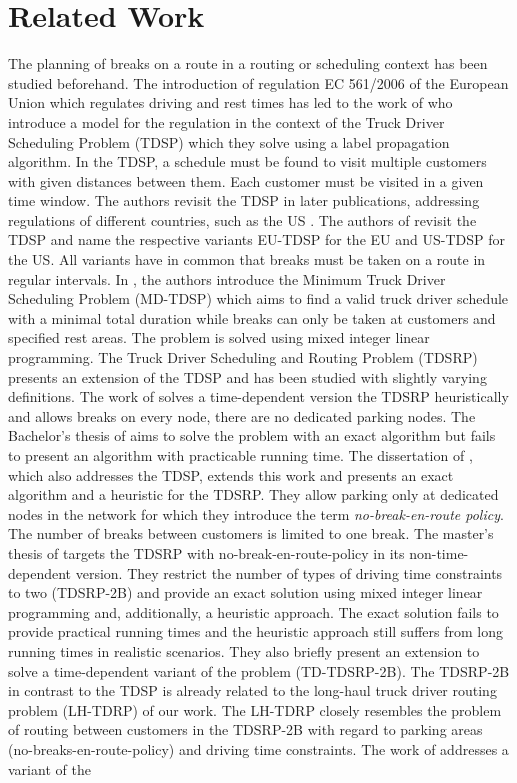 
\chapter{Related Work\label{ch:related_work}}
The planning of breaks on a route in a routing or scheduling context has been studied beforehand. The introduction of regulation EC 561/2006 of the European Union \cite{europeanparliament:2006} which regulates driving and rest times has led to the work of \cite{goel:2009} who introduce a model for the regulation in the context of the Truck Driver Scheduling Problem (TDSP) which they solve using a label propagation algorithm. In the TDSP, a schedule must be found to visit multiple customers with given distances between them. Each customer must be visited in a given time window. The authors revisit the TDSP in later publications, addressing regulations of different countries, such as the US \cite{goel:2012}. The authors of \cite{sartori:20210107} revisit the TDSP and name the respective variants EU-TDSP for the EU and US-TDSP for the US. All variants have in common that breaks must be taken on a route in regular intervals. In \cite{goel:2012a}, the authors introduce the Minimum Truck Driver Scheduling Problem (MD-TDSP) which aims to find a valid truck driver schedule with a minimal total duration while breaks can only be taken at customers and specified rest areas. The problem is solved using mixed integer linear programming. The Truck Driver Scheduling and Routing Problem (TDSRP) presents an extension of the TDSP and has been studied with slightly varying definitions. The work of \cite{shah:2008} solves a time-dependent version the TDSRP heuristically and allows breaks on every node, there are no dedicated parking nodes. The Bachelor's thesis of \cite{braeuer:2016} aims to solve the problem with an exact algorithm but fails to present an algorithm with practicable running time. The dissertation of \cite{kleff:2019}, which also addresses the TDSP, extends this work and presents an exact algorithm and a heuristic for the TDSRP. They allow parking only at dedicated nodes in the network for which they introduce the term \emph{no-break-en-route policy}. The number of breaks between customers is limited to one break. The master's thesis of \cite{bomsdorf:2020} targets the TDSRP with no-break-en-route-policy in its non-time-dependent version. They restrict the number of types of driving time constraints to two (TDSRP-2B) and provide an exact solution using mixed integer linear programming and, additionally, a heuristic approach. The exact solution fails to provide practical running times and the heuristic approach still suffers from long running times in realistic scenarios. They also briefly present an extension to solve a time-dependent variant of the problem (TD-TDSRP-2B). The TDSRP-2B in contrast to the TDSP is already related to the long-haul truck driver routing problem (LH-TDRP) of our work. The LH-TDRP closely resembles the problem of routing between customers in the TDSRP-2B with regard to parking areas (no-breaks-en-route-policy) and driving time constraints. The work of \cite{mayerle:2020} addresses a variant of the 